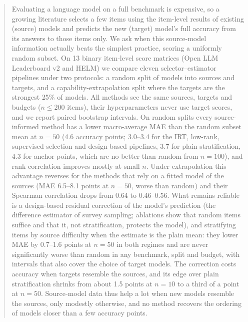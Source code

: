\begin{abstract}
Evaluating a language model on a full benchmark is expensive, so a growing literature selects a few items using the item-level results of existing (source) models and predicts the new (target) model's full accuracy from its answers to those items only. We ask when this source-model information actually beats the simplest practice, scoring a uniformly random subset. On 13 binary item-level score matrices (Open LLM Leaderboard v2 and HELM) we compare eleven selector--estimator pipelines under two protocols: a random split of models into sources and targets, and a capability-extrapolation split where the targets are the strongest 25\% of models. All methods see the same sources, targets and budgets ($n\le 200$ items), their hyperparameters never use target scores, and we report paired bootstrap intervals. On random splits every source-informed method has a lower macro-average MAE than the random subset mean at $n{=}50$ (4.6 accuracy points; 3.0--3.4 for the IRT, low-rank, supervised-selection and design-based pipelines, 3.7 for plain stratification, 4.3 for anchor points, which are no better than random from $n{=}100$), and rank correlation improves mostly at small $n$. Under extrapolation this advantage reverses for the methods that rely on a fitted model of the sources (MAE 6.5--8.1 points at $n{=}50$, worse than random) and their Spearman correlation drops from 0.64 to 0.46--0.56. What remains reliable is a design-based residual correction of the model's prediction (the difference estimator of survey sampling; ablations show that random items suffice and that it, not stratification, protects the model), and stratifying items by source difficulty when the estimate is the plain mean: they lower MAE by 0.7--1.6 points at $n{=}50$ in both regimes and are never significantly worse than random in any benchmark, split and budget, with intervals that also cover the choice of target models. The correction costs accuracy when targets resemble the sources, and its edge over plain stratification shrinks from about 1.5 points at $n{=}10$ to a third of a point at $n{=}50$. Source-model data thus help a lot when new models resemble the sources, only modestly otherwise, and no method recovers the ordering of models closer than a few accuracy points.
\end{abstract}
